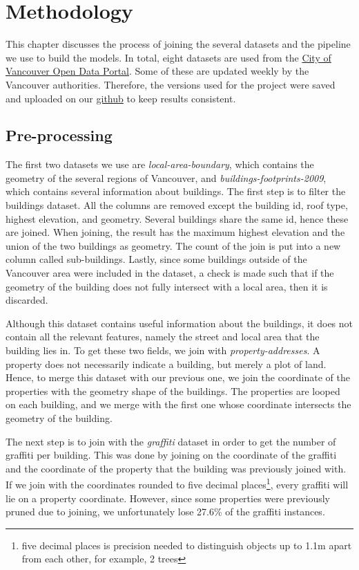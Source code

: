 \chapter{Methodology}


This chapter discusses the process of joining the several datasets and the pipeline we use to build the models. In total, eight datasets are used from the \href{https://opendata.vancouver.ca/pages/home/}{City of Vancouver Open Data Portal}. Some of these are updated weekly by the Vancouver authorities. Therefore, the versions used for the project were saved and uploaded on our \href{https://github.com/CowKeyMan/PredictingGraffitiUsingCityLayouts}{github} to keep results consistent.

\section{Pre-processing}

The first two datasets we use are \textit{local-area-boundary}, which contains the geometry of the several regions of Vancouver, and \textit{buildings-footprints-2009}, which contains several information about buildings. The first step is to filter the buildings dataset. All the columns are removed except the building id, roof type, highest elevation, and geometry. Several buildings share the same id, hence these are joined. When joining, the result has the maximum highest elevation and the union of the two buildings as geometry. The count of the join is put into a new column called sub-buildings. Lastly, since some buildings outside of the Vancouver area were included in the dataset, a check is made such that if the geometry of the building does not fully intersect with a local area, then it is discarded.

Although this dataset contains useful information about the buildings, it does not contain all the relevant features, namely the street and local area that the building lies in. To get these two fields, we join with \textit{property-addresses}. A property does not necessarily indicate a building, but merely a plot of land. Hence, to merge this dataset with our previous one, we join the coordinate of the properties with the geometry shape of the buildings. The properties are looped on each building, and we merge with the first one whose coordinate intersects the geometry of the building.

The next step is to join with the \textit{graffiti} dataset in order to get the number of graffiti per building. This was done by joining on the coordinate of the graffiti and the coordinate of the property that the building was previously joined with. If we join with the coordinates rounded to five decimal places\footnote{five decimal places is precision needed to distinguish objects up to 1.1m apart from each other, for example, 2 trees}, every graffiti will lie on a property coordinate. However, since some properties were previously pruned due to joining, we unfortunately lose 27.6\% of the graffiti instances.

